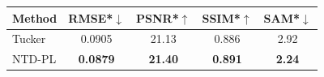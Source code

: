 \begin{tabular}{@{}l cccc@{}}
\toprule
Method & RMSE*$\downarrow$ & PSNR*$\uparrow$ & SSIM*$\uparrow$ & SAM*$\downarrow$ \\
\midrule
Tucker & 0.0905 & 21.13 & 0.886 & 2.92 \\
NTD-PL & \textbf{0.0879} & \textbf{21.40} & \textbf{0.891} & \textbf{2.24} \\
\bottomrule
\end{tabular}
